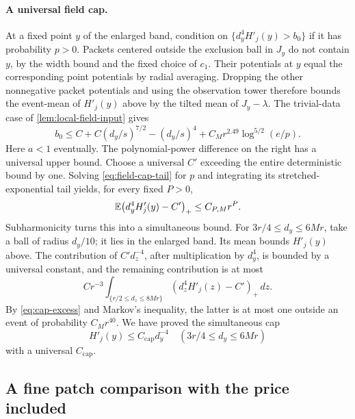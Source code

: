 \paragraph{A universal field cap.}
At a fixed point $y$ of the enlarged band, condition on
$\{d_y^4H'_j(y)>b_0\}$ if it has probability $p>0$.
Packets centered outside the exclusion ball in $J_y$ do not contain $y$,
by the width bound and the fixed choice of $c_1$.  Their potentials at
$y$ equal the corresponding point potentials by radial averaging.
Dropping the other nonnegative packet potentials and using the observation
tower therefore bounds the event-mean of $H'_j(y)$ above by the tilted
mean of $J_y-\lambda$.  The trivial-data case of
\cref{lem:local-field-input} gives
\begin{equation}
 b_0\leq C+C(d_y/s)^{7/2}-(d_y/s)^4
              +C_Mr^{2.49}\log^{5/2}(e/p).
 \label{eq:field-cap-tail}
\end{equation}
Here $a<1$ eventually.  The polynomial-power difference on the right
has a universal upper bound.  Choose a universal $C'$ exceeding the
entire deterministic bound by one.  Solving
\cref{eq:field-cap-tail} for $p$ and integrating its stretched-exponential
tail yields, for every fixed $P>0$,
\begin{equation}
 \mathbb E\bigl(d_y^4H'_j(y)-C'\bigr)_+
                    \leq C_{P,M}r^P.
 \label{eq:cap-excess}
\end{equation}
Subharmonicity turns this into a simultaneous bound.  For
$3r/4\leq d_y\leq6Mr$, take a ball of radius $d_y/10$; it lies in the
enlarged band.  Its mean bounds $H'_j(y)$ above.  The contribution of
$C'd_z^{-4}$, after multiplication by $d_y^4$, is bounded by a universal
constant, and the remaining contribution is at most
\[
 Cr^{-3}\int_{\{r/2\leq d_z\leq8Mr\}}
                         (d_z^4H'_j(z)-C')_+\,dz.
\]
By \cref{eq:cap-excess} and Markov's inequality, the latter is at most one
outside an event of probability $C_Mr^{40}$.  We have proved the
simultaneous cap
\begin{equation}
 H'_j(y)\leq C_{\mathrm{cap}}d_y^{-4}
       \quad(3r/4\leq d_y\leq6Mr)
 \label{eq:enlarged-field-cap}
\end{equation}
with a universal $C_{\mathrm{cap}}$.

\subsection{A fine patch comparison with the price included}

